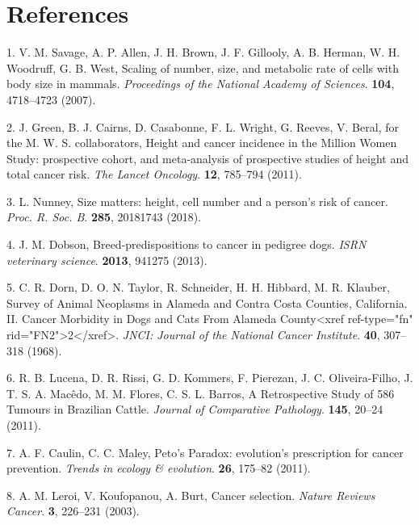 \documentclass[]{elsarticle} %
\begin{document}
\hypertarget{references}{%
\section*{References}\label{references}}

\hypertarget{refs}{}
\leavevmode\hypertarget{ref-Savage2007}{}%
1. V. M. Savage, A. P. Allen, J. H. Brown, J. F. Gillooly, A. B. Herman, W. H. Woodruff, G. B. West, Scaling of number, size, and metabolic rate of cells with body size in mammals. \emph{Proceedings of the National Academy of Sciences}. \textbf{104}, 4718--4723 (2007).

\leavevmode\hypertarget{ref-Green2011}{}%
2. J. Green, B. J. Cairns, D. Casabonne, F. L. Wright, G. Reeves, V. Beral, for the M. W. S. collaborators, Height and cancer incidence in the Million Women Study: prospective cohort, and meta-analysis of prospective studies of height and total cancer risk. \emph{The Lancet Oncology}. \textbf{12}, 785--794 (2011).

\leavevmode\hypertarget{ref-Nunney:20181c2}{}%
3. L. Nunney, Size matters: height, cell number and a person's risk of cancer. \emph{Proc. R. Soc. B}. \textbf{285}, 20181743 (2018).

\leavevmode\hypertarget{ref-Dobson2013}{}%
4. J. M. Dobson, Breed-predispositions to cancer in pedigree dogs. \emph{ISRN veterinary science}. \textbf{2013}, 941275 (2013).

\leavevmode\hypertarget{ref-Dorn1968}{}%
5. C. R. Dorn, D. O. N. Taylor, R. Schneider, H. H. Hibbard, M. R. Klauber, Survey of Animal Neoplasms in Alameda and Contra Costa Counties, California. II. Cancer Morbidity in Dogs and Cats From Alameda County\textless xref ref-type="fn" rid="FN2"\textgreater2\textless/xref\textgreater{}. \emph{JNCI: Journal of the National Cancer Institute}. \textbf{40}, 307--318 (1968).

\leavevmode\hypertarget{ref-Lucena2011}{}%
6. R. B. Lucena, D. R. Rissi, G. D. Kommers, F. Pierezan, J. C. Oliveira-Filho, J. T. S. A. Macêdo, M. M. Flores, C. S. L. Barros, A Retrospective Study of 586 Tumours in Brazilian Cattle. \emph{Journal of Comparative Pathology}. \textbf{145}, 20--24 (2011).

\leavevmode\hypertarget{ref-Caulin2011}{}%
7. A. F. Caulin, C. C. Maley, Peto's Paradox: evolution's prescription for cancer prevention. \emph{Trends in ecology \& evolution}. \textbf{26}, 175--82 (2011).

\leavevmode\hypertarget{ref-Leroi2003}{}%
8. A. M. Leroi, V. Koufopanou, A. Burt, Cancer selection. \emph{Nature Reviews Cancer}. \textbf{3}, 226--231 (2003).
\end{document}
